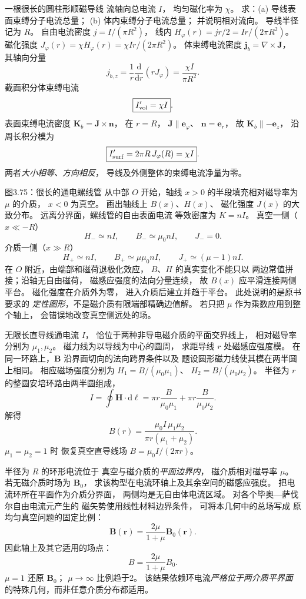 一根很长的圆柱形顺磁导线
流轴向总电流 $I$，
均匀磁化率为 $\chi$。
求：(a) 导线表面束缚分子电流总量；
(b) 体内束缚分子电流总量；
并说明相对流向。
\exsolution
导线半径记为 $R$。
自由电流密度
$j=I/(\pi R^2)$，
线内
$H_\varphi(r)=jr/2=Ir/(2\pi R^2)$。
磁化强度
$J_\varphi(r)=\chi H_\varphi(r)
=\chi I r/(2\pi R^2)$。
体束缚电流密度
$\bm j_b=\nabla\times\bm J$，
其轴向分量
\[
j_{b,z}=\frac1r\frac{\mathrm d}{\mathrm dr}
(rJ_\varphi)
=\frac{\chi I}{\pi R^2}.
\]
截面积分体束缚电流
\[
\boxed{I'_{\rm vol}=\chi I}.
\]
表面束缚电流密度
$\bm K_b=\bm J\times\bm n$，
在 $r=R$，
$\bm J\parallel\bm e_\varphi$、
$\bm n=\bm e_r$，
故 $\bm K_b\parallel-\bm e_z$，
沿周长积分模为
\[
\boxed{I'_{\rm surf}=
2\pi R\,J_\varphi(R)=\chi I}.
\]
\excheck 两者\emph{大小相等、方向相反}，
导线及外侧整体的束缚电流净量为零。

图3.75：很长的通电螺线管
从中部 $O$ 开始，轴线 $x>0$
的半段填充相对磁导率为 $\mu$ 的介质，
$x<0$ 为真空。
画出轴线上 $B(x)$、$H(x)$、
磁化强度 $J(x)$ 的大致分布。
\exsolution
远离分界面，螺线管的自由表面电流
等效密度为 $K=nI$。
真空一侧（$x\ll-R$）
\[
\boxed{H_-\simeq nI,\qquad
B_-\simeq\mu_0nI,\qquad J_-=0}.
\]
介质一侧（$x\gg R$）
\[
\boxed{H_+\simeq nI,\qquad
B_+\simeq\mu\mu_0nI,\qquad
J_+\simeq(\mu-1)nI}.
\]
在 $O$ 附近，由端部和磁荷退极化效应，
$B$、$H$ 的真实变化不能只以
两边常值拼接；沿轴无自由磁荷，
磁感应强度的法向分量连续，
故 $B(x)$ 应平滑连接两侧平台。
磁化强度在介质外为零，
进入介质后建立并趋于平台。
\excheck 此处说明的是原书要求的
\emph{定性图形}，不是磁介质有限端部精确边值解。
若只把 $\mu$ 作为乘数应用到整个轴上，
会错误地改变真空侧远处的场。

无限长直导线通电流 $I$，
恰位于两种非导电磁介质的平面交界线上，
相对磁导率分别为 $\mu_1,\mu_2$。
磁力线为以导线为中心的圆周，
求距导线 $r$ 处磁感应强度模。
\exsolution
在同一环路上，$\bm B$
沿界面切向的法向跨界条件以及
题设圆形磁力线使其模在两半圆上相同。
相应磁场强度分别为
$H_1=B/(\mu_0\mu_1)$、
$H_2=B/(\mu_0\mu_2)$。
半径为 $r$ 的整圆安培环路由两半圆组成，
\[
I=\oint\bm H\cdot\mathrm d\bm\ell
=\pi r\frac B{\mu_0\mu_1}
+\pi r\frac B{\mu_0\mu_2}.
\]
解得
\[
\boxed{B(r)=\frac{\mu_0I\,\mu_1\mu_2}
{\pi r(\mu_1+\mu_2)}}.
\]
\excheck $\mu_1=\mu_2=1$ 时
恢复真空直导线场
$B=\mu_0I/(2\pi r)$。

半径为 $R$ 的环形电流位于
真空与磁介质的\emph{平面边界内}，
磁介质相对磁导率 $\mu$。
若无磁介质时场为 $\bm B_0$，
求该构型在电流环轴上及其余空间的磁感应强度。
\exsolution
把电流环所在平面作为介质分界面，
两侧均是无自由体电流区域。
对各个毕奥—萨伐尔自由电流元产生的
磁矢势使用线性材料边界条件，
可将本几何中的总场写成
原均匀真空问题的固定比例：
\[
\bm B(\bm r)=\frac{2\mu}{1+\mu}\bm B_0(\bm r).
\]
因此轴上及其它适用的场点：
\[
\boxed{B=\frac{2\mu}{1+\mu}B_0}.
\]
\excheck $\mu=1$ 还原 $\bm B_0$；
$\mu\to\infty$ 比例趋于2。
该结果依赖环电流\emph{严格位于两介质平界面}
的特殊几何，而非任意介质分布都适用。

